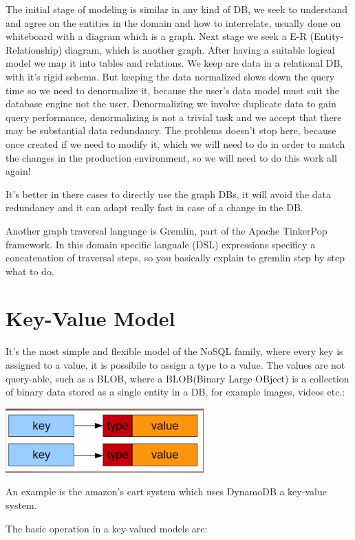 \documentclass[a4page, 11pt]{article}
\begin{document}
The initial stage of modeling is similar in any kind of DB, we seek to
understand and agree on the entities in the domain and how to
interrelate, usually done on whiteboard with a diagram which is a graph.
Next stage we seek a E-R (Entity-Relationship) diagram, which is another
graph. After having a suitable logical model we map it into tables and
relations. We keep are data in a relational DB, with it's rigid schema.
But keeping the data normalized slows down the query time so we need to
denormalize it, because the user's data model must suit the database
engine not the user. Denormalizing we involve duplicate data to gain
query performance, denormalizing is not a trivial task and we accept
that there may be substantial data redundancy. The problems doesn't stop
here, because once created if we need to modify it, which we will need
to do in order to match the changes in the production environment, so we
will need to do this work all again!

It's better in there cases to directly use the graph DBs, it will avoid
the data redundancy and it can adapt really fast in case of a change in
the DB.

Another graph traversal language is Gremlin, part of the Apache
TinkerPop framework. In this domain specific languale (DSL) expressions
specificy a concatenation of traversal steps, so you basically explain
to gremlin step by step what to do.

\section{Key-Value Model}

It's the most simple and flexible model of the NoSQL family, where every
key is assigned to a value, it is possibile to assign a type to a value.
The values are not query-able, such as a BLOB, where a BLOB(Binary Large
OBject) is a collection of binary data stored as a single entity in a
DB, for example images, videos etc.:
\begin{center}
\includegraphics[scale=0.5]{IMAGE3.jpg}
\end{center}
An example is the amazon's cart system which uses DynamoDB a key-value
system.

The basic operation in a key-valued models are:
\end{document}
